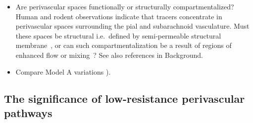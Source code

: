\documentclass[fleqn,10pt]{wlscirep}
\newcommand{\draft}[1]{\textcolor{gray}{#1}}
\begin{document}
\begin{itemize}
\item
  Are perivascular spaces functionally or structurally
  compartmentalized? Human and rodent observations indicate that
  tracers concentrate in perivascular spaces surrounding the pial and
  subarachnoid vasculature. Must these spaces be structural
  i.e.~defined by semi-permeable structural
  membrane~\cite{zhang1990interrelationships, zhang1992directional,
    mestre2018flow, eide2024functional}, or can such
  compartmentalization be a result of regions of enhanced flow or
  mixing~\cite{bedussi2017paravascular, vinje2021brain}? See also
  references in Background.
\item
  Compare Model A variations ).
\end{itemize}

\draft{\lipsum[1]}

\subsection*{The significance of low-resistance perivascular pathways}
\end{document}
